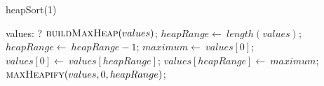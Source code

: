 \documentclass[a4paper,10pt]{article}
\begin{document}
\begin{algorithm}
\caption{heapSort(1)}
\begin{algorithmic}[5]
\State {}
\State {}
    \State values: ?
  \EndDecl
  \State \(\Call{buildMaxHeap}{values}\);
  \State \(heapRange\gets\ length(values)\);
    \State \(heapRange\gets\ heapRange-1\);
    \State \(maximum\gets\ values[0]\);
    \State \(values[0]\gets\ values[heapRange]\);
    \State \(values[heapRange]\gets\ maximum\);
    \State \(\Call{maxHeapify}{values,0,heapRange}\);
  \EndFor
\EndProcedure
\end{algorithmic}
\end{algorithm}
\end{document}

